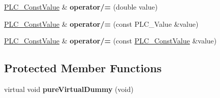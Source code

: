 \begin{DoxyCompactItemize}
\item 
\hypertarget{classns3_1_1PLC__ConstValue_a4e6137edeee17f29d9911226d0f2c4d1}{\hyperlink{classns3_1_1PLC__ConstValue}{\-P\-L\-C\-\_\-\-Const\-Value} \& {\bfseries operator/=} (double value)}\label{classns3_1_1PLC__ConstValue_a4e6137edeee17f29d9911226d0f2c4d1}

\item 
\hypertarget{classns3_1_1PLC__ConstValue_a686f86030b4af672c652fd23204da883}{\hyperlink{classns3_1_1PLC__ConstValue}{\-P\-L\-C\-\_\-\-Const\-Value} \& {\bfseries operator/=} (const \-P\-L\-C\-\_\-\-Value \&value)}\label{classns3_1_1PLC__ConstValue_a686f86030b4af672c652fd23204da883}

\item 
\hypertarget{classns3_1_1PLC__ConstValue_aa64c833a709291cc4890dc310d73a2d2}{\hyperlink{classns3_1_1PLC__ConstValue}{\-P\-L\-C\-\_\-\-Const\-Value} \& {\bfseries operator/=} (const \hyperlink{classns3_1_1PLC__ConstValue}{\-P\-L\-C\-\_\-\-Const\-Value} \&value)}\label{classns3_1_1PLC__ConstValue_aa64c833a709291cc4890dc310d73a2d2}

\end{DoxyCompactItemize}
\subsection*{\-Protected \-Member \-Functions}
\begin{DoxyCompactItemize}
\item 
\hypertarget{classns3_1_1PLC__ConstValue_ab64342256f19120dce7d8fc09f0bb05d}{virtual void {\bfseries pure\-Virtual\-Dummy} (void)}\label{classns3_1_1PLC__ConstValue_ab64342256f19120dce7d8fc09f0bb05d}

\end{DoxyCompactItemize}
